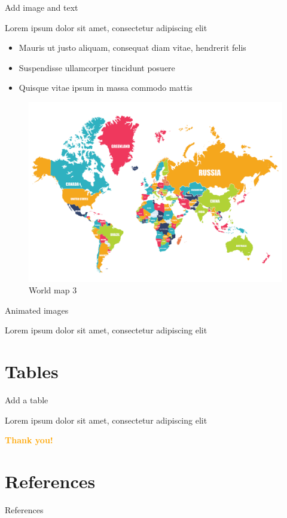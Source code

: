 \documentclass[aspectratio=169]{beamer} %
\begin{document}
\begin{frame}{Add image and text}

Lorem ipsum dolor sit amet, consectetur adipiscing elit

	\begin{multicols}{2}

		\begin{itemize}
			\item Mauris ut justo aliquam, consequat diam vitae, hendrerit felis
			\item Suspendisse ullamcorper tincidunt posuere
			\item Quisque vitae ipsum in massa commodo mattis
		\end{itemize}
		\begin{figure}
			\centering
			\includegraphics[width=\linewidth]{img/world-map}
			\caption{World map 3}
			\label{fig:world-map3}
		\end{figure}

	\end{multicols}

\end{frame}

\begin{frame}{Animated images}

Lorem ipsum dolor sit amet, consectetur adipiscing elit

\end{frame}

\section{Tables}
\begin{frame}{Add a table}

Lorem ipsum dolor sit amet, consectetur adipiscing elit

\end{frame}


\begin{frame}
	\centering\Huge\textcolor{orange}{\textbf{Thank you!}}
\end{frame}

\section{References}
\begin{frame}{References}
	\begin{tiny}\end{tiny}
\end{frame}
\end{document}

